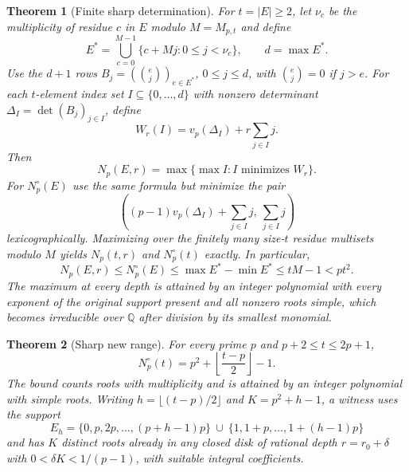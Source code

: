 \documentclass[11pt]{article}
\newtheorem{theorem}{Theorem}[section]
\theoremstyle{remark}\newtheorem{remark}[theorem]{Remark}
\newcommand{\Q}{\mathbb Q}\newcommand{\Z}{\mathbb Z}\newcommand{\F}{\mathbb F}\newcommand{\C}{\mathbb C}
\newcommand{\vp}{v_p}\newcommand{\ord}{\operatorname{ord}}\newcommand{\spn}{\operatorname{span}}\newcommand{\res}{\operatorname{res}}
\begin{document}
\begin{theorem}[Finite sharp determination]\label{thm:algorithm}
For $t=|E|\ge2$, let $\nu_c$ be the multiplicity of residue $c$ in $E$ modulo $M=M_{p,t}$ and define
\begin{equation}\label{eq:representative}
 E^*=\bigcup_{c=0}^{M-1}\{c+Mj:0\le j<\nu_c\},\qquad d=\max E^*.
\end{equation}
Use the $d+1$ rows $B_j=(\binom{e}{j})_{e\in E^*}$, $0\le j\le d$, with $\binom ej=0$ if $j>e$.
For each $t$-element index set $I\subseteq\{0,\ldots,d\}$ with nonzero determinant
$\Delta_I=\det(B_j)_{j\in I}$, define
\[
 W_r(I)=\vp(\Delta_I)+r\sum_{j\in I}j.
\]
Then
\begin{equation}\label{eq:matrix}
 N_p(E,r)=\max\{\max I: I\text{ minimizes }W_r\}.
\end{equation}
For $N_p^\circ(E)$ use the same formula but minimize the pair
\begin{equation}\label{eq:lex}
 \left((p-1)\vp(\Delta_I)+\sum_{j\in I}j,\ \sum_{j\in I}j\right)
\end{equation}
lexicographically. Maximizing over the finitely many size-$t$ residue multisets
modulo $M$ yields $N_p(t,r)$ and $N_p^\circ(t)$ exactly. In particular,
\begin{equation}\label{eq:degreebound}
 N_p(E,r)\le N_p^\circ(E)\le\max E^*-\min E^*\le tM-1<pt^2.
\end{equation}
The maximum at every depth is attained by an integer polynomial with every exponent
of the original support present and all nonzero roots simple, which becomes irreducible over
$\Q$ after division by its smallest monomial.
\end{theorem}

\begin{theorem}[Sharp new range]\label{thm:sharp}
For every prime $p$ and $p+2\le t\le2p+1$,
\begin{equation}\label{eq:sharp}
 \boxed{\displaystyle N_p^\circ(t)=p^2+\left\lfloor\frac{t-p}{2}\right\rfloor-1.}
\end{equation}
The bound counts roots with multiplicity and is attained by an integer polynomial with
simple roots. Writing $h=\lfloor(t-p)/2\rfloor$ and $K=p^2+h-1$, a witness uses the support
\begin{equation}\label{eq:witnesssupport}
 E_h=\{0,p,2p,\ldots,(p+h-1)p\}\ \cup\ \{1,1+p,\ldots,1+(h-1)p\}
\end{equation}
and has $K$ distinct roots already in any closed disk of rational depth
$r=r_0+\delta$ with $0<\delta K<1/(p-1)$, with suitable integral coefficients.
\end{theorem}
\end{document}
